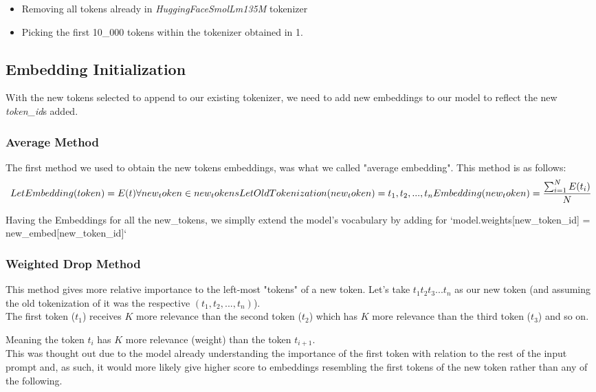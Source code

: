 \begin{itemize}
    \item Removing all tokens already in \textit{HuggingFaceSmolLm135M} tokenizer
    \item Picking the first 10_000 tokens within the tokenizer obtained in 1.
\end{itemize}

\subsection{Embedding Initialization}
With the new tokens selected to append to our existing tokenizer, we need to add new embeddings to our model to reflect
the new \textit{token_id}s added.

\subsubsection{Average Method}
The first method we used to obtain the new tokens embeddings, was what we called "average embedding".
This method is as follows:
$$
    Let Embedding(token) = E(t) \\
    \forall new_token \in new_tokens \\
    Let OldTokenization(new_token) = {t_1, t_2, ..., t_n} \\
    Embedding(new_token) = \frac{\sum_{i=1}^{N}E(t_i)}{N}
$$

Having the Embeddings for all the new_tokens, we simplly extend the model's vocabulary by adding for `model.weights[new_token_id] = new_embed[new_token_id]`

\subsubsection{Weighted Drop Method}
This method gives more relative importance to the left-most "tokens" of a new token.
Let's take $t_1t_2t_3...t_n$ as our new token (and assuming the old tokenization of it was the respective $(t_1, t_2, ..., t_n)$).\\
The first token ($t_1$) receives $K$ more relevance than the second token ($t_2$) which has $K$ more relevance than the third token ($t_3$) and so on.

Meaning the token $t_i$ has $K$ more relevance (weight) than the token $t_{i+1}$.\\
This was thought out due to the model already understanding the importance of the first token with relation to the rest of the input prompt and, as such,
it would more likely give higher score to embeddings resembling the first tokens of the new token rather than any of the following.

